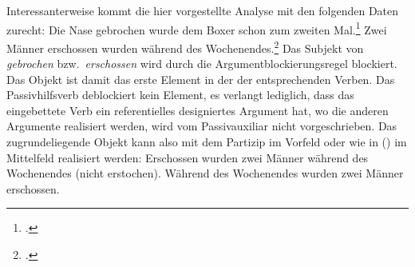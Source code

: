 Interessanterweise kommt die hier vorgestellte Analyse mit den folgenden Daten zurecht:
\eal
\label{bsp-subjekt-im-vf-passiv}
\ex{}
Die Nase gebrochen wurde dem Boxer schon zum zweiten Mal.\footnote{
        .
}
\ex{}
Zwei Männer erschossen wurden    während des Wochenendes.\footnote{
        .%
        }
\label{bsp-subjekt-im-vf-passiv-letzt}
\zl
Das Subjekt von \emph{gebrochen} bzw.\ \emph{erschossen} %
wird durch die Argumentblockierungsregel blockiert. Das Objekt ist damit das erste
Element in der \compsl der entsprechenden Verben. Das Passivhilfsverb deblockiert kein
Element, es verlangt lediglich, dass das eingebettete Verb ein referentielles designiertes Argument
hat, wo die anderen Argumente realisiert werden, wird vom Passivauxiliar nicht vorgeschrieben.
Das zugrundeliegende Objekt kann also mit dem Partizip im Vorfeld oder wie in ()
im Mittelfeld realisiert werden:
\eal
\ex Erschossen wurden zwei Männer während des Wochenendes (nicht erstochen).
\ex Während des Wochenendes wurden zwei Männer erschossen.
\zl

